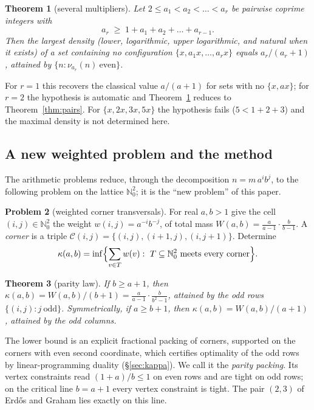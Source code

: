 \documentclass[11pt]{amsart}
\newtheorem{theorem}{Theorem}[section]
\theoremstyle{definition}
\newtheorem{problem}[theorem]{Problem}
\newcommand{\N}{\mathbb{N}}
\newcommand{\Cor}{\mathcal{C}}
\begin{document}
\begin{theorem}[several multipliers]\label{thm:several}
Let $2\le a_1<a_2<\dots<a_r$ be pairwise coprime integers with
\[
a_r\;\ge\;1+a_1+a_2+\dots+a_{r-1}.
\]
Then the largest density (lower, logarithmic, upper logarithmic, and natural when it exists) of a set containing no configuration $\{x,a_1x,\dots,a_rx\}$ equals $a_r/(a_r+1)$, attained by $\{n:\nu_{a_r}(n)\ \text{even}\}$.
\end{theorem}

For $r=1$ this recovers the classical value $a/(a+1)$ for sets with no $\{x,ax\}$; for $r=2$ the hypothesis is automatic and Theorem~\ref{thm:several} reduces to Theorem~\ref{thm:pairs}. For $\{x,2x,3x,5x\}$ the hypothesis fails ($5<1+2+3$) and the maximal density is not determined here.

\subsection{A new weighted problem and the method}
The arithmetic problems reduce, through the decomposition $n=m\,a^ib^j$, to the following problem on the lattice $\N_0^2$; it is the ``new problem'' of this paper.

\begin{problem}[weighted corner transversals]\label{prob:kappa}
For real $a,b>1$ give the cell $(i,j)\in\N_0^2$ the weight $w(i,j)=a^{-i}b^{-j}$, of total mass $W(a,b)=\frac{a}{a-1}\cdot\frac{b}{b-1}$. A \emph{corner} is a triple $\Cor(i,j)=\{(i,j),(i+1,j),(i,j+1)\}$. Determine
\[
\kappa(a,b)=\inf\Bigl\{\sum_{v\in T}w(v):\ T\subseteq\N_0^2\ \text{meets every corner}\Bigr\}.
\]
\end{problem}

\begin{theorem}[parity law]\label{thm:parity}
If $b\ge a+1$, then $\kappa(a,b)=W(a,b)/(b+1)=\frac{a}{a-1}\cdot\frac{b}{b^2-1}$, attained by the odd rows $\{(i,j): j\ \text{odd}\}$. Symmetrically, if $a\ge b+1$, then $\kappa(a,b)=W(a,b)/(a+1)$, attained by the odd columns.
\end{theorem}

The lower bound is an explicit fractional packing of corners, supported on the corners with even second coordinate, which certifies optimality of the odd rows by linear-programming duality (\S\ref{sec:kappa}). We call it the \emph{parity packing}. Its vertex constraints read $(1+a)/b\le1$ on even rows and are tight on odd rows; on the critical line $b=a+1$ every vertex constraint is tight. The pair $(2,3)$ of Erd\H{o}s and Graham lies exactly on this line.
\end{document}
